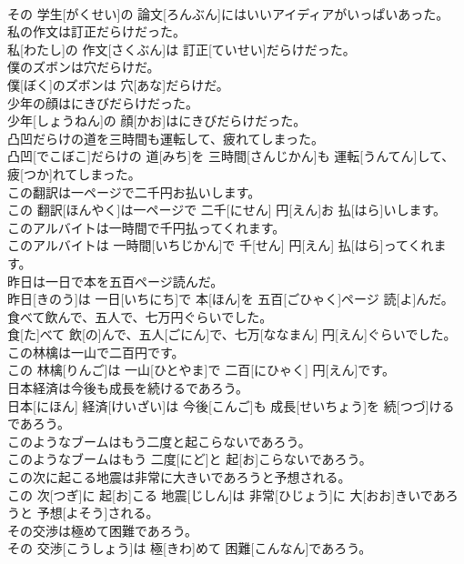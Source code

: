\documentclass[8pt]{extreport}
\begin{document}
\begin{CJK}{UTF8}{min}
\\	その 学生[がくせい]の 論文[ろんぶん]にはいいアイディアがいっぱいあった。
\\	私の作文は訂正だらけだった。	
\\	私[わたし]の 作文[さくぶん]は 訂正[ていせい]だらけだった。
\\	僕のズボンは穴だらけだ。	
\\	僕[ぼく]のズボンは 穴[あな]だらけだ。
\\	少年の顔はにきびだらけだった。	
\\	少年[しょうねん]の 顔[かお]はにきびだらけだった。
\\	凸凹だらけの道を三時間も運転して、疲れてしまった。	
\\	凸凹[でこぼこ]だらけの 道[みち]を 三時間[さんじかん]も 運転[うんてん]して、 疲[つか]れてしまった。
\\	この翻訳は一ページで二千円お払いします。	
\\	この 翻訳[ほんやく]は一ページで 二千[にせん] 円[えん]お 払[はら]いします。
\\	このアルバイトは一時間で千円払ってくれます。	
\\	このアルバイトは 一時間[いちじかん]で 千[せん] 円[えん] 払[はら]ってくれます。
\\	昨日は一日で本を五百ページ読んだ。	
\\	昨日[きのう]は 一日[いちにち]で 本[ほん]を 五百[ごひゃく]ページ 読[よ]んだ。
\\	食べて飲んで、五人で、七万円ぐらいでした。	
\\	食[た]べて 飲[の]んで、五人[ごにん]で、七万[ななまん] 円[えん]ぐらいでした。
\\	この林檎は一山で二百円です。	
\\	この 林檎[りんご]は 一山[ひとやま]で 二百[にひゃく] 円[えん]です。
\\	日本経済は今後も成長を続けるであろう。	
\\	日本[にほん] 経済[けいざい]は 今後[こんご]も 成長[せいちょう]を 続[つづ]けるであろう。
\\	このようなブームはもう二度と起こらないであろう。	
\\	このようなブームはもう 二度[にど]と 起[お]こらないであろう。
\\	この次に起こる地震は非常に大きいであろうと予想される。	
\\	この 次[つぎ]に 起[お]こる 地震[じしん]は 非常[ひじょう]に 大[おお]きいであろうと 予想[よそう]される。
\\	その交渉は極めて困難であろう。	
\\	その 交渉[こうしょう]は 極[きわ]めて 困難[こんなん]であろう。

\end{CJK}
\end{document}
